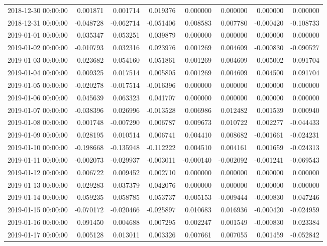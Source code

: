 \begin{tabular}{lrrrrrrr}
2018-12-30 00:00:00 & 0.001871 & 0.001714 & 0.019376 & 0.000000 & 0.000000 & 0.000000 & 0.000000 \\
2018-12-31 00:00:00 & -0.048728 & -0.062714 & -0.051406 & 0.008583 & 0.007780 & -0.000420 & -0.108733 \\
2019-01-01 00:00:00 & 0.035347 & 0.053251 & 0.039879 & 0.000000 & 0.000000 & 0.000000 & 0.000000 \\
2019-01-02 00:00:00 & -0.010793 & 0.032316 & 0.023976 & 0.001269 & 0.004609 & -0.000830 & -0.090527 \\
2019-01-03 00:00:00 & -0.023682 & -0.054160 & -0.051861 & 0.001269 & 0.004609 & -0.005002 & 0.091704 \\
2019-01-04 00:00:00 & 0.009325 & 0.017514 & 0.005805 & 0.001269 & 0.004609 & 0.004500 & 0.091704 \\
2019-01-05 00:00:00 & -0.020278 & -0.017514 & -0.016396 & 0.000000 & 0.000000 & 0.000000 & 0.000000 \\
2019-01-06 00:00:00 & 0.045639 & 0.063323 & 0.041707 & 0.000000 & 0.000000 & 0.000000 & 0.000000 \\
2019-01-07 00:00:00 & -0.038396 & 0.026996 & -0.013528 & 0.006986 & 0.012482 & 0.001539 & 0.000940 \\
2019-01-08 00:00:00 & 0.001748 & -0.007290 & 0.006787 & 0.009673 & 0.010722 & 0.002277 & -0.044433 \\
2019-01-09 00:00:00 & 0.028195 & 0.010514 & 0.006741 & 0.004410 & 0.008682 & -0.001661 & -0.024231 \\
2019-01-10 00:00:00 & -0.198668 & -0.135948 & -0.112222 & 0.004510 & 0.004161 & 0.001659 & -0.024313 \\
2019-01-11 00:00:00 & -0.002073 & -0.029937 & -0.003011 & -0.000140 & -0.002092 & -0.001241 & -0.069543 \\
2019-01-12 00:00:00 & 0.006722 & 0.009452 & 0.002710 & 0.000000 & 0.000000 & 0.000000 & 0.000000 \\
2019-01-13 00:00:00 & -0.029283 & -0.037379 & -0.042076 & 0.000000 & 0.000000 & 0.000000 & 0.000000 \\
2019-01-14 00:00:00 & 0.059235 & 0.058785 & 0.053737 & -0.005153 & -0.009444 & -0.000830 & 0.047246 \\
2019-01-15 00:00:00 & -0.070172 & -0.020466 & -0.025897 & 0.010683 & 0.016936 & -0.000420 & -0.024959 \\
2019-01-16 00:00:00 & 0.091450 & 0.004688 & 0.007295 & 0.002247 & 0.001549 & -0.000830 & 0.023384 \\
2019-01-17 00:00:00 & 0.005128 & 0.013011 & 0.003326 & 0.007661 & 0.007055 & 0.001459 & -0.052842 \\

\end{tabular}
